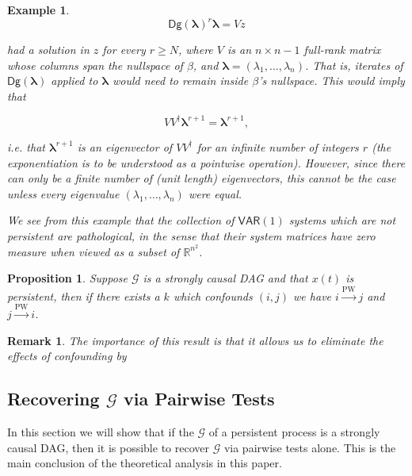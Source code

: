 \documentclass{statsoc}
\def\pwgc{\overset{\text{PW}}{\rightarrow}}  %
\def\gcg{\mathcal{G}}  %
\def\VAR{\mathsf{VAR}}  %
\newtheorem{proposition}{Proposition}
\newtheorem{remark}{Remark}
\newtheorem{example}{Example}
\def\R{\mathbb{R}}  %
\def\Dg{\mathsf{Dg }}   %
\begin{document}
\begin{example}
  \begin{equation*}
    \Dg(\bm{\lambda})^r \bm{\lambda} = Vz
  \end{equation*}

  had a solution in $z$ for every $r \ge N$, where $V$ is an
  $n \times n - 1$ full-rank matrix whose columns span the nullspace of $\beta$,
  and $\bm{\lambda} = (\lambda_1, \ldots, \lambda_n)$. That is,
  iterates of $\Dg(\bm{\lambda})$ applied to $\bm{\lambda}$ would need to remain
  inside $\beta$'s nullspace.  This would imply that

  \begin{equation*}
    VV^\dagger \bm{\lambda}^{r + 1} = \bm{\lambda}^{r + 1},
  \end{equation*}

  i.e. that $\bm{\lambda}^{r + 1}$ is an eigenvector of $VV^\dagger$
  for an infinite number of integers $r$ (the exponentiation is to be
  understood as a pointwise operation).  However, since there can only
  be a finite number of (unit length) eigenvectors, this cannot be the
  case unless every eigenvalue $(\lambda_1, \ldots, \lambda_n)$ were
  equal.

  We see from this example that the collection of $\VAR(1)$ systems
  which are not persistent are pathological, in the sense that their
  system matrices have zero measure when viewed as a subset of $\R^{n^2}$.
\end{example}

\begin{proposition}
  \label{prop:persistence_converse}
  Suppose $\gcg$ is a strongly causal DAG and that $x(t)$ is
  persistent, then if there exists a $k$ which confounds $(i, j)$ we
  have $i \pwgc j$ and $j \pwgc i$.
\end{proposition}

\begin{remark}
  The importance of this result is that it allows us to eliminate the
  effects of confounding by 
\end{remark}

\subsection{Recovering $\gcg$ via Pairwise Tests}
\label{sec:pairwise_algorithm}
In this section we will show that if the $\gcg$ of a persistent
process is a strongly causal DAG, then it is possible to recover
$\gcg$ via pairwise tests alone.  This is the main conclusion of the
theoretical analysis in this paper.
\end{document}
